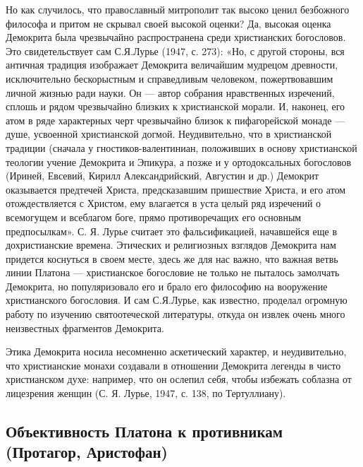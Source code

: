 Но  как  случилось,  что  православный  митрополит  так  высоко  ценил
безбожного  философа  и  притом   не  скрывал  своей  высокой  оценки?
Да,  высокая оценка  Демокрита была  чрезвычайно распространена  среди
христианских  богословов.  Это  свидетельствует сам  С.Я.Лурье  (1947,
с.  273): «Но,  с  другой стороны,  вся  античная традиция  изображает
Демокрита величайшим мудрецом  древности, исключительно бескорыстным и
справедливым человеком,  пожертвовавшим личной  жизнью ради  науки. Он
--- автор собрания нравственных  изречений, сплошь и рядом чрезвычайно
близких к христианской морали. И, наконец, его атом в ряде характерных
черт  чрезвычайно близок  к пифагорейской  монаде ---  душе, усвоенной
христианской  догмой.  Неудивительно,   что  в  христианской  традиции
(сначала  у гностиков-валентиниан,  положивших  в основу  христианской
теологии  учение  Демокрита и  Эпикура,  а  позже и  у  ортодоксальных
богословов  (Ириней,  Евсевий,   Кирилл  Александрийский,  Августин  и
др.) Демокрит  оказывается предтечей Христа,  предсказавшим пришествие
Христа,  и  его  атом  отождествляется  с  Христом,  ему  влагается  в
уста  целый  ряд  изречений  о  всемогущем  и  всеблагом  боге,  прямо
противоречащих  его основным  предпосылкам». С.  Я. Лурье  считает это
фальсификацией,  начавшейся еще  в  дохристианские времена.  Этических
и  религиозных  взглядов  Демокрита  нам придется  коснуться  в  своем
месте, здесь  же для  нас важно,  что важная  ветвь линии  Платона ---
христианское богословие не только  не пыталось замолчать Демокрита, но
популяризовало его  и брало его философию  на вооружение христианского
богословия. И сам С.Я.Лурье, как известно, проделал огромную работу по
изучению  святоотеческой  литературы,  откуда он  извлек  очень  много
неизвестных фрагментов Демокрита.

Этика   Демокрита   носила   несомненно   аскетический   характер,   и
неудивительно, что христианские монахи создавали в отношении Демокрита
легенды  в чисто  христианском духе:  например, что  он ослепил  себя,
чтобы избежать  соблазна от лицезрения  женщин (С. Я. Лурье,  1947, с.
138, по Тертуллиану).

\subsection{Объективность Платона к противникам (Протагор, Аристофан)}


